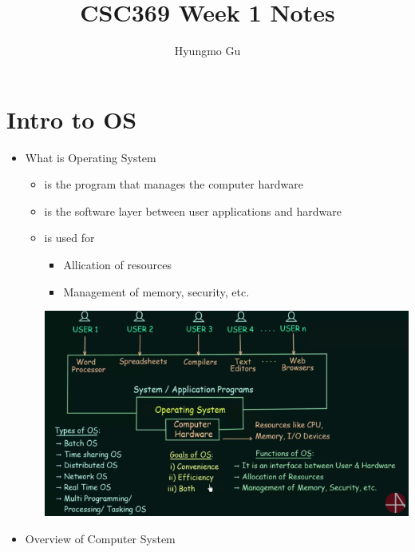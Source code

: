 \documentclass[12pt]{article}
\begin{document}
\title{CSC369 Week 1 Notes}
\author{Hyungmo Gu}
\maketitle

\section{Intro to OS}

\bigskip

\begin{itemize}
    \item What is Operating System
    \begin{itemize}
        \item is the program that manages the computer hardware
        \item is the software layer between user applications and hardware
        \item is used for
        \begin{itemize}
            \item Allication of resources
            \item Management of memory, security, etc.
        \end{itemize}

        \begin{center}
        \includegraphics[width=\linewidth]{../images/week_1_notes_1_1.png}
        \end{center}
    \end{itemize}
    \item Overview of Computer System

    \bigskip


\end{itemize}
\end{document}

